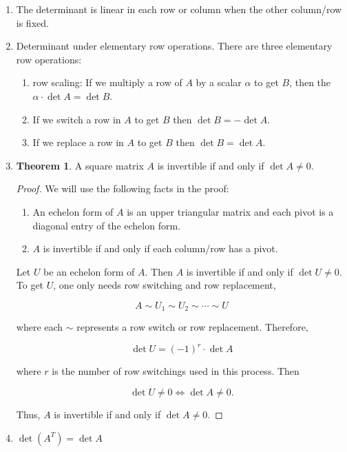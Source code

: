 \documentclass[12pt]{article}
\theoremstyle{definition}
\newtheorem{theorem}{Theorem}[section]  %
\begin{document}
\begin{enumerate}[label = (\arabic*)]
\item The determinant is linear in each row or column when the other column/row is fixed.
\item Determinant under elementary row operations. There are three elementary row operations:
\begin{enumerate}[label = (\arabic*)]

\item row scaling: If we multiply a row of $A$ by a scalar $\alpha$ to get $B$, then the
 $\alpha \cdot \det A = \det B$.
\item If we switch a row in $A$ to get $B$ then $\det B = - \det A$.
\item If we replace a row in $A$ to get $B$ then $\det B = \det A$.  
\end{enumerate}
\item \begin{theorem}
A square matrix $A$ is invertible if and only if $\det A \neq 0$.
\end{theorem}

\begin{proof}
We will use the following facts in the proof:

\begin{enumerate}[label = (\alph*)]
\item An echelon form of $A$ is an upper triangular matrix and each
pivot is a diagonal entry of the echelon form.
\item $A$ is invertible if and only if each column/row has a pivot.
\end{enumerate}

Let $U$ be an echelon form of $A$. Then $A$ is invertible if and only
if $\det U \neq 0$. To get $U$, one only needs row switching and row
replacement,

\[A \sim U_1 \sim U_2 \sim \cdots \sim U \]

where each $\sim$ represents a row switch or row replacement. Therefore,

\[\det U = (-1)^r \cdot \det A \]

where $r$ is the number of row switchings used in this process. Then 

\[ \det U \neq 0 \iff \det A \neq 0.\]

Thus, $A$ is invertible if and only if $\det A \neq 0$.
\end{proof}

\item $\det (A^T) = \det A$


\end{enumerate}
\end{document}

